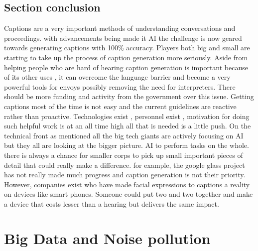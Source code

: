 \documentclass[sigconf]{acmart}
\begin{document}
\subsection{Section conclusion}
Captions are a very important methods of understanding conversations and proceedings. with advancements being made it AI the challenge is now geared towards generating captions with 100\% accuracy. Players both big and small are starting to take up the process of caption generation more seriously. Aside from helping people who are hard of hearing caption generation is important because of its other uses , it can overcome the language barrier and become a very powerful tools for envoys possibly removing the need for interpreters. There should be more funding and activity from the government over this issue. Getting captions most of the time is not easy and the current guidelines are reactive rather than proactive. Technologies exist , personnel exist , motivation for doing such helpful work is at an all time high all that is needed is a little push. On the technical front as mentioned all the big tech giants are actively focusing on AI but they all are looking at the bigger picture. AI to perform tasks on the whole. there is always a chance for smaller corps to pick up small important pieces of detail that could really make a difference. for example, the google glass project has not really made much progress and caption generation is not their priority. However, companies exist who have made facial expressions to captions a reality on devices like smart phones. Someone could put two and two together and make a device that costs lesser than a hearing but delivers the same impact.

\section{Big Data and Noise pollution}
\end{document}
